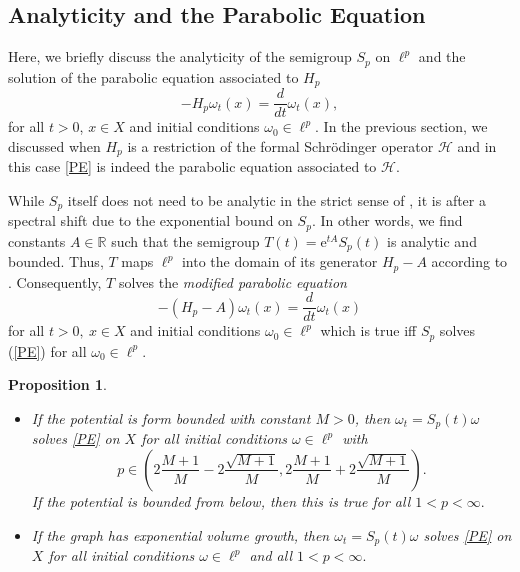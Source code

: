 \documentclass[10pt]{amsart}
\newtheorem{proposition}[theorem]{Proposition}
\theoremstyle{definition}
\begin{document}
\subsection{Analyticity and the Parabolic Equation}
Here, we briefly discuss the analyticity of the semigroup $S_p$ on $\ell^p$ and the solution of the parabolic equation associated to $ H_p$
\begin{equation}\tag{PE} \label{PE}
    - H_p\omega_t(x) = \frac{d}{dt}\omega_t(x),
\end{equation}
for all $t>0$, $x\in X$ and initial conditions $\omega_0\in\ell^p.$ In the previous section, we discussed when $H_p$ is a restriction of the formal Schrödinger operator $\mathcal{H}$ and in this case \eqref{PE} is indeed the parabolic equation associated to $\mathcal{H}$.

While $S_p$ itself does not need to be analytic in the strict sense of \cite[Chapter~II Definition~4.5]{EngelNagelShort}, it is after a spectral shift due to the exponential bound on $S_p$. In other words, we find constants $A\in\mathbb{R}$ such that the semigroup $T(t) = \mathrm{e}^{tA}S_p(t)$ is analytic and bounded. Thus, $T$ maps $\ell^p$ into the domain of its generator $H_p-A$ according to \cite[Chapter~II Theorem~4.6]{EngelNagelShort}. Consequently, $T$ solves the \emph{modified parabolic equation} \[- (H_p-A)\omega_t(x) = \frac{d}{dt}\omega_t(x)\] for all $t> 0,~x\in X$ and initial conditions $\omega_0\in\ell^p$ which is true iff $S_p$ solves (\ref{PE}) for all $\omega_0\in\ell^p.$
\begin{proposition}\label{analyticity}
    \begin{itemize}
        \item [(a)] If the potential is form
bounded with constant $M>0$, then $\omega_t = S_p(t)\omega$ solves %
\eqref{PE} on $X$ for all initial conditions $\omega\in\ell^p$ with \[p\in \left(2\frac{M+1}{M}-2\frac{\sqrt{M+1}}{M},2\frac{M+1}{M}+2\frac{\sqrt{M+1}}{M}\right).\]
If  the potential is  bounded from below, then this is true for all $1<p<\infty.$
        \item [(b)] If the graph   has exponential volume growth, then $\omega_t = S_p(t)\omega$ solves %
        \eqref{PE} on $X$ for all initial conditions $\omega\in\ell^p$ and all $1<p<\infty.$
    \end{itemize}
    \end{proposition}
\end{document}
